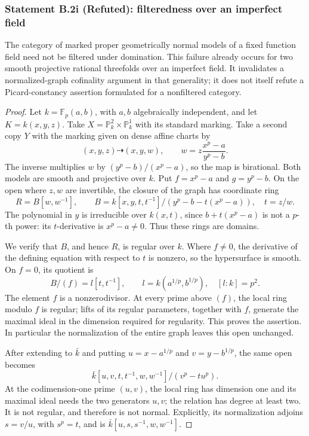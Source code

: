 \subsubsection*{Statement B.2i (Refuted): filteredness over an imperfect field}
The category of marked proper geometrically normal models of a fixed
function field need not be filtered under domination.  This failure
already occurs for two smooth projective rational threefolds over an
imperfect field.  It invalidates a normalized-graph cofinality argument
in that generality; it does not itself refute a Picard-constancy
assertion formulated for a nonfiltered category.
\begin{proof}
Let $k=\mathbb F_p(a,b)$, with $a,b$ algebraically independent, and
let $K=k(x,y,z)$.  Take $X=\mathbb P^2_k\times\mathbb P^1_k$ with
its standard marking.  Take a second copy $Y$ with the marking given
on dense affine charts by
\[
 (x,y,z)\dashrightarrow (x,y,w),\qquad
 w=z\frac{x^p-a}{y^p-b}.
\]
The inverse multiplies $w$ by $(y^p-b)/(x^p-a)$, so the map is
birational.  Both models are smooth and projective over $k$.
Put $f=x^p-a$ and $g=y^p-b$.  On the open where $z,w$ are invertible,
the closure of the graph has coordinate ring
\[
 R=B[w,w^{-1}],\qquad
 B=k[x,y,t,t^{-1}]/(y^p-b-t(x^p-a)),\quad t=z/w.
 \tag{B.2.5}
\]
The polynomial in $y$ is irreducible over $k(x,t)$, since
$b+t(x^p-a)$ is not a $p$-th power: its $t$-derivative is $x^p-a\ne0$.
Thus these rings are domains.

We verify that $B$, and hence $R$, is regular over $k$.  Where
$f\ne0$, the derivative of the defining equation with respect to
$t$ is nonzero, so the hypersurface is smooth.  On $f=0$, its
quotient is
\[
 B/(f)=l[t,t^{-1}],\qquad l=k(a^{1/p},b^{1/p}),\quad [l:k]=p^2.
\]
The element $f$ is a nonzerodivisor.  At every prime above $(f)$,
the local ring modulo $f$ is regular; lifts of its regular parameters,
together with $f$, generate the maximal ideal in the dimension
required for regularity.  This proves the assertion.  In particular
the normalization of the entire graph leaves this open unchanged.

After extending to $\bar k$ and putting
$u=x-a^{1/p}$ and $v=y-b^{1/p}$, the same open becomes
\[
 \bar k[u,v,t,t^{-1},w,w^{-1}]/(v^p-tu^p).
\]
At the codimension-one prime $(u,v)$, the local ring has dimension
one and its maximal ideal needs the two generators $u,v$; the
relation has degree at least two.  It is not regular, and therefore
is not normal.  Explicitly, its normalization adjoins $s=v/u$, with
$s^p=t$, and is $\bar k[u,s,s^{-1},w,w^{-1}]$.


\end{proof}
